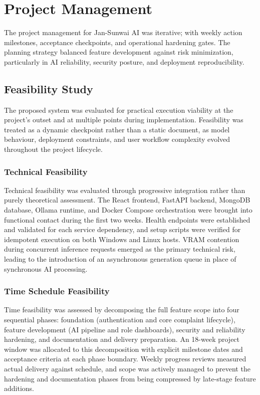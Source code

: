 \chapter{Project Management}

The project management for Jan-Sunwai AI was iterative; with weekly action milestones, acceptance checkpoints, and operational hardening gates. The planning strategy balanced feature development against risk minimization, particularly in AI reliability, security posture, and deployment reproducibility.

\section{Feasibility Study}

The proposed system was evaluated for practical execution viability at the project's outset and at multiple points during implementation. Feasibility was treated as a dynamic checkpoint rather than a static document, as model behaviour, deployment constraints, and user workflow complexity evolved throughout the project lifecycle.

\subsection{Technical Feasibility}

Technical feasibility was evaluated through progressive integration rather than purely theoretical assessment. The React frontend, FastAPI backend, MongoDB database, Ollama runtime, and Docker Compose orchestration were brought into functional contact during the first two weeks. Health endpoints were established and validated for each service dependency, and setup scripts were verified for idempotent execution on both Windows and Linux hosts. VRAM contention during concurrent inference requests emerged as the primary technical risk, leading to the introduction of an asynchronous generation queue in place of synchronous AI processing.

\subsection{Time Schedule Feasibility}

Time feasibility was assessed by decomposing the full feature scope into four sequential phases: foundation (authentication and core complaint lifecycle), feature development (AI pipeline and role dashboards), security and reliability hardening, and documentation and delivery preparation. An 18-week project window was allocated to this decomposition with explicit milestone dates and acceptance criteria at each phase boundary. Weekly progress reviews measured actual delivery against schedule, and scope was actively managed to prevent the hardening and documentation phases from being compressed by late-stage feature additions.

